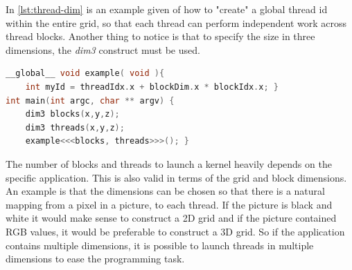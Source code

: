 In \autoref{lst:thread-dim} is an example given of how to "create" a global thread id within the entire grid, so that each thread can perform independent work across thread blocks.
Another thing to notice is that to specify the size in three dimensions, the \textit{dim3} construct must be used.
\begin{lstlisting}[language=C,caption={Example of thread id usage in a grid of multiple thread blocks},label=lst:thread-dim]
__global__ void example( void ){
	int myId = threadIdx.x + blockDim.x * blockIdx.x; }
int main(int argc, char ** argv) {
	dim3 blocks(x,y,z);
	dim3 threads(x,y,z);
	example<<<blocks, threads>>>(); }
\end{lstlisting}
The number of blocks and threads to launch a kernel heavily depends on the specific application.
This is also valid in terms of the grid and block dimensions.
An example is that the dimensions can be chosen so that there is a natural mapping from a pixel in a picture, to each thread.
If the picture is black and white it would make sense to construct a 2D grid and if the picture contained RGB values, it would be preferable to construct a 3D grid.
So if the application contains multiple dimensions, it is possible to launch threads in multiple dimensions to ease the programming task.

